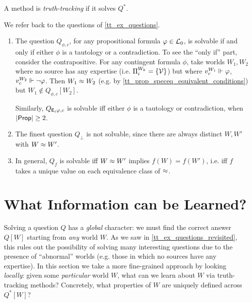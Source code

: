 \begin{definition}
    \label{tt_def_truthtracking}
    A method is \emph{truth-tracking} if it solves $Q^*$.
\end{definition}

\begin{example}
    \label{tt_ex_questions_revisited}
    We refer back to the questions of \cref{tt_ex_questions}.
    \begin{enumerate}
        \item The question $Q_{\phi, c}$, for any propositional formula $\varphi
              \in \mathcal{L}_0$, is solvable if and only if either $\phi$ is a
              tautology or a contradiction. To see the ``only if'' part,
              consider the contrapositive. For any contingent formula $\phi$,
              take worlds $W_1, W_2$ where no source has any expertise (i.e.
              $\Pi^{W_k}_i = \{\mathcal{V}\}$) but where $v^{W_1}_c \Vdash
              \varphi$, $v^{W_2}_c \Vdash \neg\varphi$. Then $W_1 \approx W_2$
              (e.g. by \cref{tt_prop_speceq_equivalent_conditions}) but $W_1
              \notin Q_{\phi, c}[W_2]$.

              Similarly, $Q_{\mathsf{E}_i\varphi, c}$ is solvable iff either $\phi$ is a
              tautology or contradiction, when $|\mathsf{Prop}| \ge 2$.

        \item The finest question $Q_\bot$ is not solvable, since there are
              always distinct $W, W'$ with $W \approx W'$.

        \item In general, $Q_f$ is solvable iff $W \approx W'$ implies $f(W) =
            f(W')$, i.e. iff $f$ takes a unique value on each equivalence class
            of $\approx$.
    \end{enumerate}
\end{example}

\section{What Information can be Learned?}
\label{tt_sec_learning_info}

Solving a question $Q$ has a \emph{global} character: we must find the correct
answer $Q[W]$ starting from \emph{any} world $W$. As we saw in
\cref{tt_ex_questions_revisited}, this rules out the possibility of solving many
interesting questions due to the presence of ``abnormal'' worlds (e.g. those in
which no sources have any expertise). In this section we take a more
fine-grained approach by looking \emph{locally}: given some \emph{particular}
world $W$, what can we learn about $W$ via truth-tracking methods?
Concretely, what properties of $W$ are uniquely defined across $Q^*[W]$?

